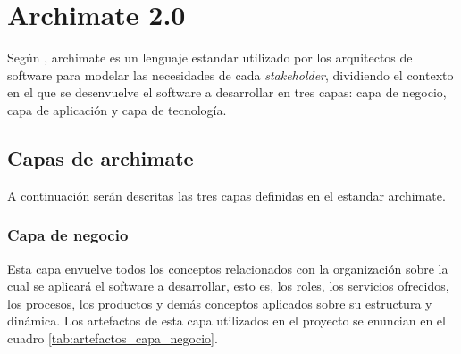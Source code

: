 \section{Archimate 2.0}

Según  \cite{archimate2}, archimate es un lenguaje estandar utilizado por los arquitectos de software para modelar las necesidades de cada \textit{stakeholder}, dividiendo el contexto en el que se desenvuelve el software a desarrollar en tres capas: capa de negocio, capa de aplicación y capa de tecnología.

\subsection{Capas de archimate}

A continuación serán descritas las tres capas definidas en el estandar archimate.

\subsubsection{Capa de negocio}

Esta capa envuelve todos los conceptos relacionados con la organización sobre la cual se aplicará el software a desarrollar, esto es, los roles, los servicios ofrecidos, los procesos, los productos y demás conceptos aplicados sobre su estructura y dinámica. Los artefactos de esta capa utilizados en el proyecto se enuncian en el cuadro \ref{tab:artefactos_capa_negocio}.

